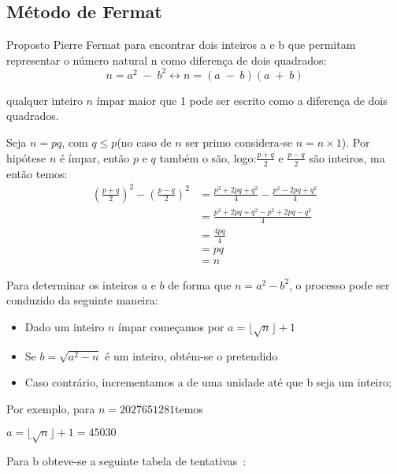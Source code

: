 \subsection{Método de Fermat}
\label{sec:metodoFermat}

Proposto Pierre Fermat para encontrar dois inteiros a e b que permitam representar o número natural n como diferença de dois quadrados:
$$n=a^2\;-\;b^2 \leftrightarrow n=(a\;-\;b)(a\;+\;b)$$

\begin{teorema}
qualquer inteiro $n$ ímpar maior que 1 pode ser escrito como a diferença de dois quadrados.
\end{teorema} 

\begin{demonstracao}
Seja $n=pq$, com $q\le p$(no caso de $n$ ser primo considera-se $n=n \times 1$).
Por hipótese $n$ é ímpar, então $p$ e $q$ também o são, logo:$\frac{p+q}{2}$ e $\frac{p-q}{2}$ são inteiros, ma então temos:
\begin{align*}
    \left(\frac{p+q}{2}\right)^2-\left(\frac{p-q}{2}\right)^2&=\frac{p^2+2pq+q^2}{4}-\frac{p^2-2pq+q^2}{4}\\
    &=\frac{p^2+2pq+q^2-p^2+2pq-q^2}{4}\\
    &=\frac{4pq}{4}\\
    &=pq\\
    &=n
\end{align*}
\end{demonstracao}

Para determinar os inteiros $a$ e $b$ de forma que $n=a^2 - b^2$, o processo pode ser conduzido da seguinte maneira:
\begin{itemize}
    \item Dado um inteiro $n$ ímpar começamos por $a=\lfloor \sqrt{n} \rfloor +1$
    \item Se $b=\sqrt{a^2-n}$ é um inteiro, obtém-se o pretendido
    \item Caso contrário, incrementamos a de uma unidade até que b seja um inteiro;
\end{itemize}

Por exemplo, para $n=2027651281$temos 

$a=\lfloor \sqrt{n} \rfloor +1=45030$

Para b obteve-se a seguinte tabela de tentativas~\cite{Quaresma2009a}:

